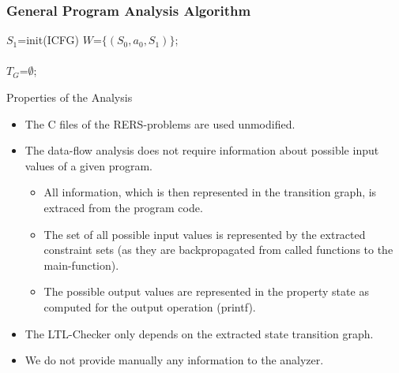 \begin{frame}[fragile]
\frametitle{General Program Analysis Algorithm}
{
\scriptsize
\begin{algorithm}[H]
\SetLine
{}


$S_1$=init(ICFG) 
$W$=$\{(S_0,a_0,S_1)\}$; \\
\\
$T_G$=$\emptyset$; \\
\label{alg:general}
\end{algorithm}
}
\end{frame}

\begin{frame}{Properties of the Analysis}
\begin{itemize}
\item The C files of the RERS-problems are used unmodified.
\item The data-flow analysis does not require information about possible input values of a
  given program. 
\begin{itemize}
\item All information, which is then represented in the
  transition graph, is extraced from the program code. 

\item The set of all
  possible input values is represented by the extracted constraint
  sets (as they are backpropagated from called functions to the
  main-function). 
\item The possible output values are represented in the
  property state as computed for the output operation (printf).
\end{itemize}
\item The LTL-Checker only depends on the extracted state transition graph.
\item We do not provide manually any information to the analyzer.
\end{itemize}

\end{frame}

